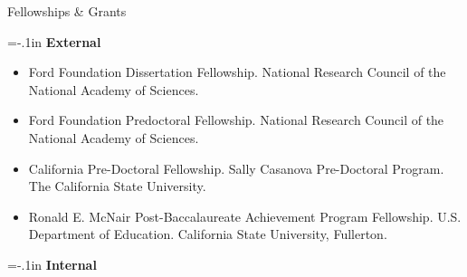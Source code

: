 \documentclass{resume} %
\newenvironment{hangt}[1]
 {\par\vspace{-\parsep}%
  \begin{itemize}[label={#1\ \quad},leftmargin=*,labelsep=0pt]
  \raggedright
  \item\relax
  \vspace*{8pt}
  }
 {\end{itemize}}
\newcommand{\datefill}{\quad \hspace{12pt}}
\begin{document}
\begin{rSection}{Fellowships \& Grants}
\noindent \vspace*{-1.5em}

{\parindent=-.1in {\bf External}}

\begin{hangt}{2016--2017}
Ford Foundation Dissertation Fellowship. National Research Council of the National Academy of Sciences. %
\end{hangt}
\begin{hangt}{2014--2016}
Ford Foundation Predoctoral Fellowship. National Research Council of the National Academy of Sciences. %
\end{hangt}
\begin{hangt}{2010 \datefill}
California Pre-Doctoral Fellowship. Sally Casanova Pre-Doctoral Program. The California State University. %
\end{hangt}
\begin{hangt}{2008 \datefill}
Ronald E. McNair Post-Baccalaureate Achievement Program Fellowship. U.S. Department of Education. California State University, Fullerton.
\end{hangt}

{\parindent=-.1in {\bf Internal}}


\end{rSection}
\end{document}
